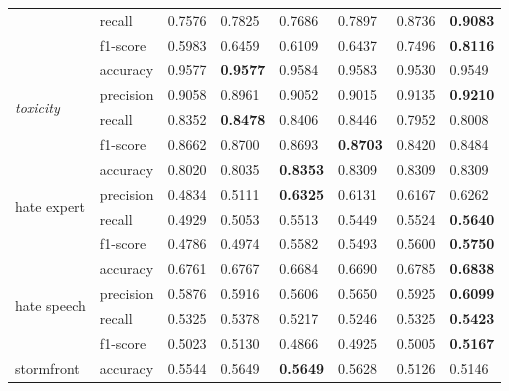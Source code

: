 \begin{table}[]
\begin{minipage}{0.42\paperheight}
{\begin{tabular}{ll|ll|ll|ll}
                                        & recall    & 0.7576 & 0.7825            & 0.7686      & 0.7897      & 0.8736 & \bf{0.9083}     \\
                                        & f1-score  & 0.5983 & 0.6459            & 0.6109      & 0.6437      & 0.7496 & \bf{0.8116}     \\ \hline
    \multirow{4}{*}{\it{toxicity}}      & accuracy  & 0.9577 & \bf{0.9577}       & 0.9584      & 0.9583      & 0.9530 & 0.9549          \\
                                        & precision & 0.9058 & 0.8961            & 0.9052      & 0.9015      & 0.9135 & \bf{0.9210}     \\
                                        & recall    & 0.8352 & \bf{0.8478}       & 0.8406      & 0.8446      & 0.7952 & 0.8008          \\
                                        & f1-score  & 0.8662 & 0.8700            & 0.8693      & \bf{0.8703} & 0.8420 & 0.8484          \\ \hline
    \multirow{4}{*}{hate expert}        & accuracy  & 0.8020 & 0.8035            & \bf{0.8353} & 0.8309      & 0.8309 & 0.8309          \\
                                        & precision & 0.4834 & 0.5111            & \bf{0.6325} & 0.6131      & 0.6167 & 0.6262          \\
                                        & recall    & 0.4929 & 0.5053            & 0.5513      & 0.5449      & 0.5524 & \bf{0.5640}     \\
                                        & f1-score  & 0.4786 & 0.4974            & 0.5582      & 0.5493      & 0.5600 & \bf{0.5750}     \\ \hline
    \multirow{4}{*}{hate speech}        & accuracy  & 0.6761 & 0.6767            & 0.6684      & 0.6690      & 0.6785 & \bf{0.6838}     \\
                                        & precision & 0.5876 & 0.5916            & 0.5606      & 0.5650      & 0.5925 & \bf{0.6099}     \\
                                        & recall    & 0.5325 & 0.5378            & 0.5217      & 0.5246      & 0.5325 & \bf{0.5423}     \\
                                        & f1-score  & 0.5023 & 0.5130            & 0.4866      & 0.4925      & 0.5005 & \bf{0.5167}     \\ \hline
    \multirow{4}{*}{stormfront}         & accuracy  & 0.5544 & 0.5649            & \bf{0.5649} & 0.5628      & 0.5126 & 0.5146          \\

\end{tabular}}
\end{minipage}
\end{table}
